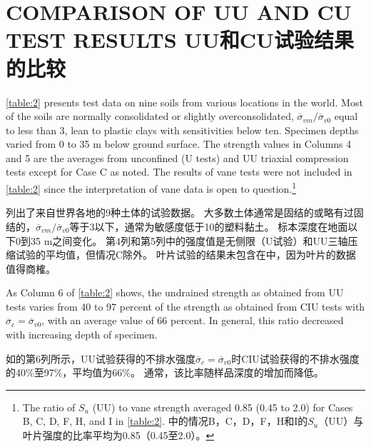 \section{COMPARISON OF UU AND CU TEST RESULTS UU和CU试验结果的比较}

\begin{paracol}{2}
    
    \autoref{table:2} presents test data on nine soils from various locations in the world. Most of the soils are normally consolidated or slightly overconsolidated, $\overline{\sigma}_{vm}/\overline{\sigma}_{v0}$ equal to less than 3, lean to plastic clays with sensitivities below ten. Specimen depths varied from 0 to 35 m below ground surface. The strength values in Columns 4 and 5 are the averages from unconfined (U tests) and UU triaxial compression tests except for Case C as noted. The results of vane tests were not included in \autoref{table:2} since the interpretation of vane data is open to question.\footnote{
        The ratio of $S_u$ (UU) to vane strength averaged 0.85 (0.45 to 2.0) for Cases B, C, D, F, H, and I in \autoref{table:2}. 中的情况B，C，D，F，H和I的$S_u$（UU）与叶片强度的比率平均为0.85（0.45至2.0）。
    }

    \switchcolumn

    列出了来自世界各地的9种土体的试验数据。 大多数土体通常是固结的或略有过固结的，$\overline{\sigma}_{vm}/\overline{\sigma}_{v0}$等于3以下，通常为敏感度低于10的塑料黏土。 标本深度在地面以下0到35 m之间变化。 第4列和第5列中的强度值是无侧限（U试验）和UU三轴压缩试验的平均值，但情况C除外。 叶片试验的结果未包含在中，因为叶片的数据值得商榷。

    \switchcolumn*

    As Column 6 of \autoref{table:2} shows, the undrained strength as obtained from UU tests varies from 40 to 97 percent of the strength as obtained from CIU tests with $\overline{\sigma}_c=\overline{\sigma}_{v0}$, with an average value of 66 percent. In general, this ratio decreased with increasing depth of specimen.

    \switchcolumn

    如的第6列所示，UU试验获得的不排水强度$\overline{\sigma}_c=\overline{\sigma}_{v0}$时CIU试验获得的不排水强度的40$\%$至97$\%$，平均值为66$\%$。 通常，该比率随样品深度的增加而降低。

    \switchcolumn*


\end{paracol}
